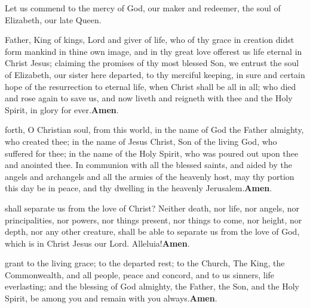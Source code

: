 



Let us commend to the mercy of God, our maker and redeemer, the soul of Elizabeth, our late Queen.

 Father, King of kings, Lord and giver of life, who of thy grace in
creation didst form mankind in thine own image, and in thy great love offerest
us life eternal in Christ Jesus; claiming the promises of thy most blessed Son, we entrust
the soul of Elizabeth, our sister here departed, to thy merciful keeping, in sure and
certain hope of the resurrection to eternal life, when Christ shall be all in all; who died
and rose again to save us, and now liveth and reigneth with thee and the Holy Spirit, in
glory for ever.\textbf{Amen}.

 forth, O Christian soul, from this world, in the name of God the Father
almighty, who created thee; in the name of Jesus Christ, Son of the living God,
who suffered for thee; in the name of the Holy Spirit, who was poured out upon thee
and anointed thee. In communion with all the blessed saints, and aided by the angels
and archangels and all the armies of the heavenly host, may thy portion this day be in
peace, and thy dwelling in the heavenly Jerusalem.\textbf{Amen}.



 shall separate us from the love of Christ? Neither death, nor life, nor
angels, nor principalities, nor powers, nor things present, nor things to come,
nor height, nor depth, nor any other creature, shall be able to separate us from the love
of God, which is in Christ Jesus our Lord. Alleluia!\textbf{Amen}.





 grant to the living grace; to the departed rest; to the Church, The King, the
Commonwealth, and all people, peace and concord, and to us sinners, life
everlasting; and the blessing of God almighty, the Father, the Son, and the Holy Spirit,
be among you and remain with you always.\textbf{Amen}.


